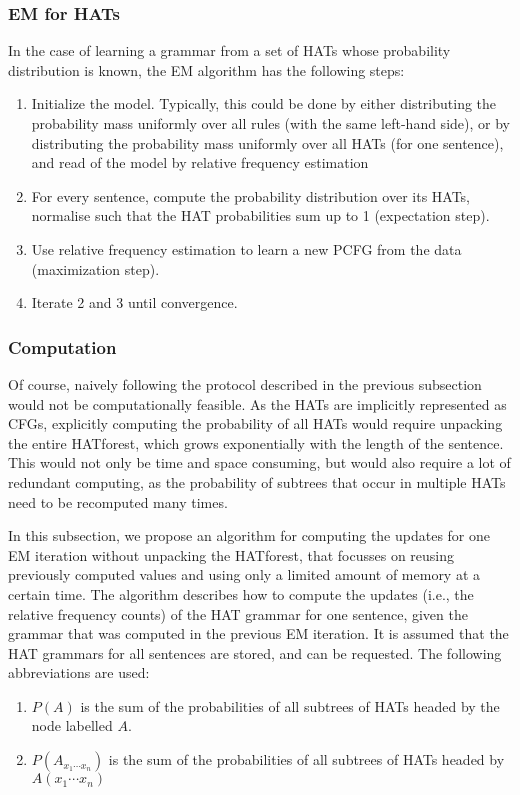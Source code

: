 \subsubsection{EM for HATs}

In the case of learning a grammar from a set of HATs whose probability distribution is known, the EM algorithm has the following steps:\begin{enumerate}
\item Initialize the model. Typically, this could be done by either distributing the probability mass uniformly over all rules (with the same left-hand side), or by distributing the probability mass uniformly over all HATs (for one sentence), and read of the model by relative frequency estimation
\item For every sentence, compute the probability distribution over its HATs, normalise such that the HAT probabilities sum up to 1 (expectation step).
\item Use relative frequency estimation to learn a new PCFG from the data (maximization step).
\item Iterate 2 and 3 until convergence.
\end{enumerate}

\subsubsection{Computation}

Of course, naively following the protocol described in the previous subsection would not be computationally feasible. As the HATs are implicitly represented as CFGs, explicitly computing the probability of all HATs would require unpacking the entire HATforest, which grows exponentially with the length of the sentence. This would not only be time and space consuming, but would also require a lot of redundant computing, as the probability of subtrees that occur in multiple HATs need to be recomputed many times.

In this subsection, we propose an algorithm for computing the updates for one EM iteration without unpacking the HATforest, that focusses on reusing previously computed values and using only a limited amount of memory at a certain time. The algorithm describes how to compute the updates (i.e., the relative frequency counts) of the HAT grammar for one sentence, given the grammar that was computed in the previous EM iteration. It is assumed that the HAT grammars for all sentences are stored, and can be requested. The following abbreviations are used:\begin{enumerate}
\item $P(A)$ is the sum of the probabilities of all subtrees of HATs headed by the node labelled $A$.
\item $P(A_{x_1\cdots x_n})$ is the sum of the probabilities of all subtrees of HATs headed by $A (x_1 \cdots x_n)$ 
\end{enumerate}

